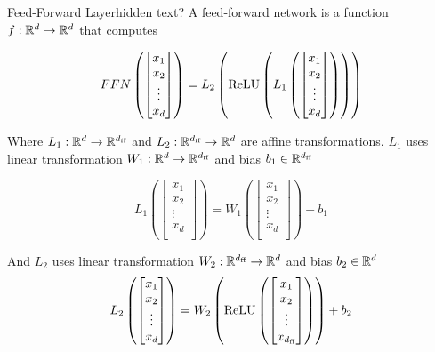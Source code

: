 \begin{definition}{Feed-Forward Layer}{hidden text?}
    A feed-forward network is a function $f:\mathbb{R}^d\to \mathbb{R}^d$ that computes 

    \[FFN\left(\begin{bmatrix}
        x_1\\
        x_2\\
        \vdots\\
        x_d\\
    \end{bmatrix}\right)= L_2\left(\text{ReLU}\left(L_1\left(\begin{bmatrix}
        x_1\\
        x_2\\
        \vdots\\
        x_d\\
    \end{bmatrix}\right)\right)\right)\]

    Where $L_1: \mathbb{R}^d \to \mathbb{R}^{d_{\text{ff}}}$ and $L_2: \mathbb{R}^{d_{\text{ff}}} \to \mathbb{R}^{d}$ are affine transformations. $L_1$ uses linear transformation $W_1:\mathbb{R}^d\to \mathbb{R}^{d_{\text{ff}}}$ and bias $b_1\in\mathbb{R}^{d_{\text{ff}}}$

    \[L_1\left(\begin{bmatrix}
        x_1\\
        x_2\\
        \vdots\\
        x_d\\
    \end{bmatrix}\right)=W_1\left(\begin{bmatrix}
        x_1\\
        x_2\\
        \vdots\\
        x_{d}\\
    \end{bmatrix}\right)+b_1\]

    And $L_2$ uses linear transformation $W_2:\mathbb{R}^{d_{\text{ff}}}\to \mathbb{R}^d$ and bias $b_2\in\mathbb{R}^{d}$
    \[L_2\left(\begin{bmatrix}
        x_1\\
        x_2\\
        \vdots\\
        x_d\\    \end{bmatrix}\right)=W_2\left(\text{ReLU}\left(\begin{bmatrix}
        x_1\\
        x_2\\
        \vdots\\
        x_{d_{\text{ff}}}\\
    \end{bmatrix}\right)\right)+b_2\]
\end{definition}

